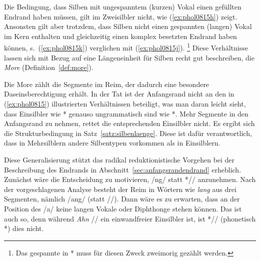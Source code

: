 Die Bedingung, dass Silben mit ungespanntem (kurzen) Vokal einen gefüllten Endrand haben müssen, gilt im Zweisilbler nicht, wie (\ref{ex:phol0815h}) zeigt.
Ansonsten gilt aber trotzdem, dass Silben nicht einen gespannten (langen) Vokal im Kern enthalten und gleichzeitig einen komplex besetzten Endrand haben können, s.\ (\ref{ex:phol0815k}) verglichen mit (\ref{ex:phol0815j}).%
\footnote{Das gespannte \textipa{[i]} in *\textipa{[v\t{i5}k.t@]} muss für diesen Zweck zweimorig gezählt werden.}
Diese Verhältnisse lassen sich mit Bezug auf eine Längeneinheit für Silben recht gut beschreiben, die \textit{More} (Definition~\ref{def:more}).


Die More zählt die Segmente im Reim, der dadurch eine besondere Daseinsberechtigung erhält.
In der Tat ist der Anfangsrand nicht an den in (\ref{ex:phol0815}) illustrierten Verhältnissen beteiligt, was man daran leicht sieht, dass Einsilbler wie *\textipa{[knI]} genauso ungrammatisch sind wie *\textipa{[kI]}.
Mehr Segmente in den Anfangsrand zu nehmen, rettet die entsprechenden Einsilbler nicht.
Es ergibt sich die Strukturbedingung in Satz~\ref{satz:silbenlaenge}.
Diese ist dafür verantwortlich, dass in Mehrsilblern andere Silbentypen vorkommen als in Einsilblern.


Diese Generalisierung stützt das radikal reduktionistische Vorgehen bei der Beschreibung des Endrands in Abschnitt~\ref{sec:anfangsrandendrand} erheblich.
Zunächst wäre die Entscheidung zu motivieren, /ng/ statt *// anzunehmen.
Nach der vorgeschlagenen Analyse besteht der Reim in Wörtern wie \textit{lang} aus drei Segmenten, nämlich /ang/ (statt //).
Dann wäre es zu erwarten, dass an der Position des /a/ keine langen Vokale oder Diphthonge stehen können.
Das ist auch so, denn während \textit{Ahn} // ein einwandfreier Einsilbler ist, ist *// (phonetisch *\textipa{[a:N]}) dies nicht.

